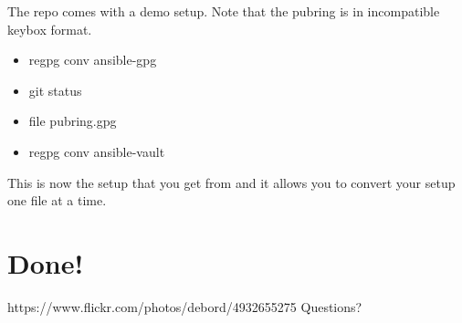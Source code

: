 {  The  repo comes with a demo setup. Note that the
  pubring is in incompatible  keybox format.

  \begin{itemize}
  \item regpg conv ansible-gpg
  \item git status
  \item file pubring.gpg
  \item regpg conv ansible-vault
  \end{itemize}

  This is now the setup that you get from 
  and it allows you to convert your setup one file at a time.

}



\section{Done!}

       {https://www.flickr.com/photos/debord/4932655275}
       {Questions?}

%

\notes{
  
  
}



